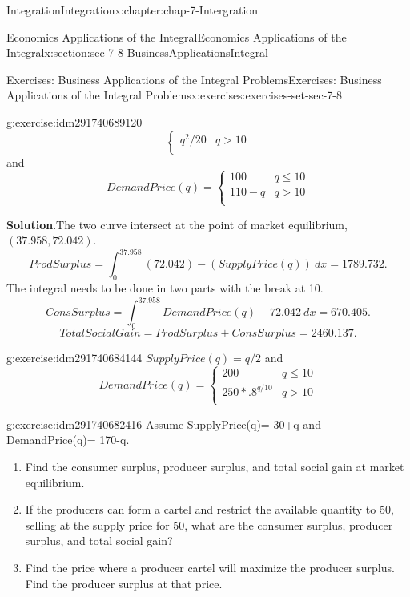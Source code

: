 \documentclass[oneside,10pt,]{book}
\numberwithin{equation}{section}
\begin{document}
\begin{chapterptx}{Integration}{}{Integration}{}{}{x:chapter:chap-7-Intergration}
\begin{sectionptx}{Economics Applications of the Integral}{}{Economics Applications of the Integral}{}{}{x:section:sec-7-8-BusinessApplicationsIntegral}
\begin{exercises-subsection}{Exercises: Business Applications of the Integral Problems}{}{Exercises: Business Applications of the Integral Problems}{}{}{x:exercises:exercises-set-sec-7-8}
\begin{divisionexercise}{5}{}{}{g:exercise:idm291740689120}
\begin{equation*}
\begin{cases}
q^2/20&q>10\\
\end{cases}
\end{equation*}
and%
%
\begin{equation*}
DemandPrice(q)=\begin{cases}
100&q\le 10\\
110-q&q>10\\
\end{cases}
\end{equation*}
\par\smallskip%
\noindent\textbf{Solution}.\hypertarget{g:solution:idm291740687344}{}\quad{}The two curve intersect at the point of market equilibrium, \((37.958, 72.042)\).%
%
\begin{equation*}
ProdSurplus=
\int_0^{37.958}
(72.042)-
(SupplyPrice(q))\ dx=1789.732.
\end{equation*}
The integral needs to be done in two parts with the break at 10.%
%
\begin{equation*}
ConsSurplus=
\int_0^{37.958}
DemandPrice(q)-72.042\ dx=670.405.
\end{equation*}
%
\begin{equation*}
TotalSocialGain=ProdSurplus+ConsSurplus=2460.137.
\end{equation*}
\end{divisionexercise}%
\begin{divisionexercise}{6}{}{}{g:exercise:idm291740684144}%
\(SupplyPrice(q)= q/2\) and%
%
\begin{equation*}
DemandPrice(q)=\begin{cases}
200&q\le 10\\
250*.8^{q/10}&q>10\\
\end{cases}
\end{equation*}
\end{divisionexercise}%
\begin{divisionexercise}{7}{}{}{g:exercise:idm291740682416}%
Assume SupplyPrice(q)= 30+q and DemandPrice(q)= 170-q.%
%
\begin{enumerate}[label=(\alph*)]
\item{}Find the consumer surplus, producer surplus, and total social gain at market equilibrium.%
\item{}If the producers can form a cartel and restrict the available quantity to 50, selling at the supply price for 50, what are the consumer surplus, producer surplus, and total social gain?%
\item{}Find the price where a producer cartel will maximize the producer surplus.  Find the producer surplus at that price.%

\end{enumerate}
\end{divisionexercise}
\end{exercises-subsection}
\end{sectionptx}
\end{chapterptx}
\end{document}
